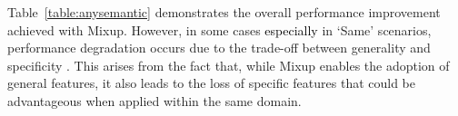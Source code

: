 \documentclass[letterpaper]{article} %
\newcommand{\nj}[1]{\textcolor{black}{#1}}
\newcommand{\yr}[1]{\textcolor{black}{#1}}
\begin{document}
Table~\ref{table:anysemantic} demonstrates the overall performance improvement achieved with Mixup. However, in some cases \nj{especially} in `Same' scenarios, performance degradation occurs due to the %
trade-off between generality and specificity \cite{theory:specificdataset}. This arises from the fact that, while Mixup enables the adoption of general features, it also leads to the loss of specific features that could be advantageous when applied within the same domain. %



\end{document}
